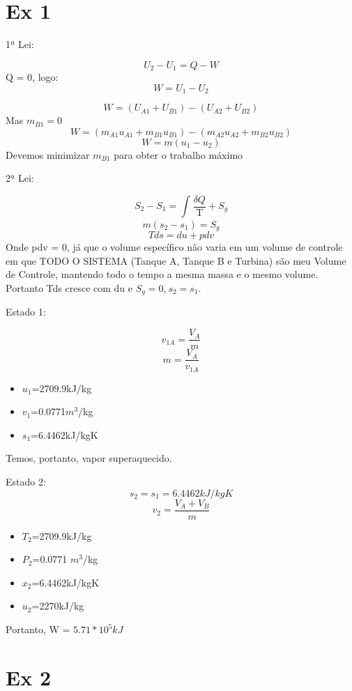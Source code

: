 \section{Ex 1}



1ª Lei:

\[U_{2}-U_{1}= Q - W \]
Q = 0, logo:
\[W = U_{1}-U_{2}\]

\[W = (U_{A1}+U_{B1})-(U_{A2}+U_{B2})\]
Mas $m_{B1}=0$
\[W = (m_{A1}u_{A1}+m_{B1}u_{B1})-(m_{A2}u_{A2}+m_{B2}u_{B2})\]
\[W=m(u_{1}-u_{2})\]
Devemos minimizar $m_{B1}$ para obter o trabalho máximo

2ª Lei:

\[S_{2}-S_{1}= \int_{}^{} \frac{\delta Q}{\text{T}} + S_{g}\]
\[m(s_{2}-s_{1})=S_{g}\]
\[Tds=du+pdv\]
Onde pdv = 0, já que o volume específico não varia em um volume de controle em que TODO O SISTEMA (Tanque A, Tanque B e Turbina) são meu Volume de Controle, mantendo todo o tempo a mesma massa e o mesmo volume. Portanto Tds cresce com du e $S_{g}=0$,$\ s_{2}=s_{1}$.

Estado 1:

\[v_{1A}= \frac{V_{A}}{m}\]
\[m=\frac{V_{A}}{v_{1A}}\]
\begin{itemize}
\item $u_{1}$=2709.9kJ/kg
\item $v_{1}$=0.0771$m^{3}$/kg
\item $s_{1}$=6.4462kJ/kgK
\end{itemize}
Temos, portanto, vapor superaquecido.

Estado 2:
\[s_{2}=s_{1}=6.4462 kJ/kgK\]
\[v_{2}=\frac{V_{A}+V_{B}}{m}\]
\begin{itemize}
\item $T_{2}$=2709.9kJ/kg
\item $P_{2}$=0.0771 $m^{3}$/kg
\item $x_{2}$=6.4462kJ/kgK
\item $u_{2}$=2270kJ/kg
\end{itemize}
Portanto, W = $5.71 * 10^{5} kJ$

\section{Ex 2} 

